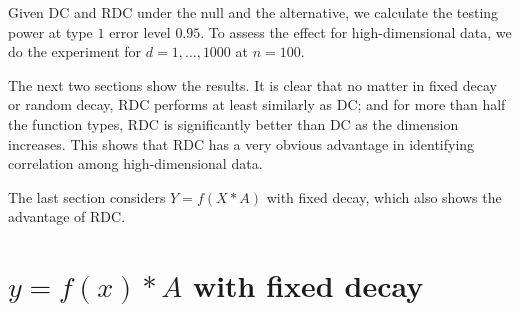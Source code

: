 \documentclass[review]{elsarticle}
\begin{document}
Given DC and RDC under the null and the alternative, we calculate the testing power at type $1$ error level $0.95$. To assess the effect for high-dimensional data, we do the experiment for $d=1,\ldots,1000$ at $n=100$. 

The next two sections show the results. It is clear that no matter in fixed decay or random decay, RDC performs at least similarly as DC; and for more than half the function types, RDC is significantly better than DC as the dimension increases. This shows that RDC has a very obvious advantage in identifying correlation among high-dimensional data.

The last section considers $Y=f(X*A)$ with fixed decay, which also shows the advantage of RDC.

\section{$y=f(x)*A$ with fixed decay}
\end{document}
